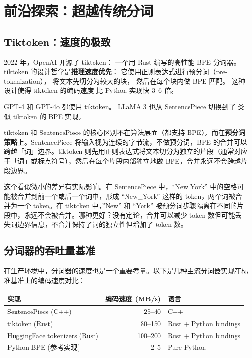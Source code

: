 \section{前沿探索：超越传统分词}

\subsection{Tiktoken：速度的极致}

2022 年，OpenAI 开源了 tiktoken：
一个用 Rust 编写的高性能 BPE 分词器。
tiktoken 的设计哲学是\textbf{推理速度优先}：
它使用正则表达式进行预分词（pre-tokenization），
将文本先切分为较大的块，
然后在每个块内做 BPE 匹配。
这种设计使得 tiktoken 的编码速度
比 Python 实现快 3--6 倍。

GPT-4 和 GPT-4o 都使用 tiktoken。
LLaMA 3 也从 SentencePiece 切换到了
类似 tiktoken 的 BPE 实现。

tiktoken 和 SentencePiece 的核心区别不在算法层面（都支持 BPE），而在\textbf{预分词策略}上。SentencePiece 将输入视为连续的字节流，不做预分词，BPE 的合并可以跨越「词」边界。tiktoken 则先用正则表达式将文本切分为独立的片段（通常对应于「词」或标点符号），然后在每个片段内部独立地做 BPE，合并永远不会跨越片段边界。

这个看似微小的差异有实际影响。在 SentencePiece 中，“New York” 中的空格可能被合并到前一个或后一个词中，形成 “New\_York” 这样的 token，两个词被合并为一个 token。在 tiktoken 中，”New” 和 “York” 被预分词步骤隔离在不同的片段中，永远不会被合并。哪种更好？没有定论，合并可以减少 token 数但可能丢失词边界信息，不合并保持了词的独立性但增加了 token 数。

\subsection{分词器的吞吐量基准}

在生产环境中，分词器的速度也是一个重要考量。以下是几种主流分词器实现在标准基准上的编码速度对比：

\begin{center}\small
\renewcommand{\arraystretch}{1.3}
\begin{tabular}{lrl}
\toprule
\rowcolor{figLightGray}
\textbf{实现} & \textbf{编码速度 (MB/s)} & \textbf{语言} \\
\midrule
SentencePiece (C++) & 25--40  & C++ \\
tiktoken (Rust)     & 80--150 & Rust + Python bindings \\
HuggingFace tokenizers (Rust) & 100--200 & Rust + Python bindings \\
Python BPE (参考实现) & 2--5 & Pure Python \\
\bottomrule
\end{tabular}
\end{center}

